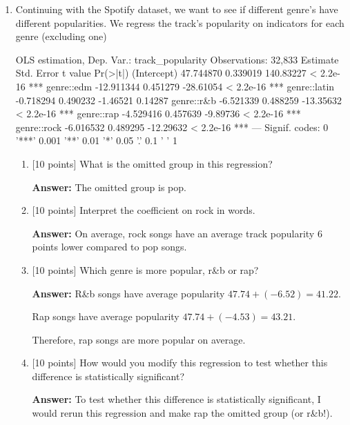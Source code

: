 \documentclass[12pt]{article}
\newcommand{\answer}[1]{{\color{blue_winged_teal}\textbf{Answer:} #1}}
\newcommand{\pts}[1]{{\color{zinc500}[#1 points]}}
\begin{document}
\begin{enumerate}
\begin{enumerate}
    \item \pts{10} Form a 95\% confidence interval for the coefficient. 
    
    \answer{With 95\% confidence, the slope coefficient falls in this range:
    $$
      \left( 11.1497 - 1.96 * 0.945354 , 11.1497 + 1.96 * 0.945354 \right) = (9.30, 13)
    $$}
  \end{enumerate}
  

  \newpage

  \vspace{5mm}
  \item Continuing with the Spotify dataset, we want to see if different genre's have different popularities. We regress the track's popularity on indicators for each genre (excluding one)
  \begin{codeblock}[{}]
OLS estimation, Dep. Var.: track_popularity
Observations: 32,833
               Estimate Std. Error   t value  Pr(>|t|)    
(Intercept)   47.744870   0.339019 140.83227 < 2.2e-16 ***
genre::edm   -12.911344   0.451279 -28.61054 < 2.2e-16 ***
genre::latin  -0.718294   0.490232  -1.46521   0.14287    
genre::r&b    -6.521339   0.488259 -13.35632 < 2.2e-16 ***
genre::rap    -4.529416   0.457639  -9.89736 < 2.2e-16 ***
genre::rock   -6.016532   0.489295 -12.29632 < 2.2e-16 ***
---
Signif. codes:  0 '***' 0.001 '**' 0.01 '*' 0.05 '.' 0.1 ' ' 1
  \end{codeblock}

  \begin{enumerate}
    \item \pts{10} What is the omitted group in this regression?
    
    \answer{The omitted group is pop.}

    \item \pts{10} Interpret the coefficient on rock in words.
    
    \answer{On average, rock songs have an average track popularity 6 points lower compared to pop songs.}
    
    \item \pts{10} Which genre is more popular, r\&b or rap?
    
    \answer{
      R\&b songs have average popularity $47.74 + (-6.52) = 41.22$.

      Rap songs have average popularity $47.74 + (-4.53) = 43.21$.

      Therefore, rap songs are more popular on average.
    }

    \item \pts{10} How would you modify this regression to test whether this difference is statistically significant?
    
    \answer{
      To test whether this difference is statistically significant, I would rerun this regression and make rap the omitted group (or r\&b!).  
    }
  \end{enumerate}
\end{enumerate}
\end{document}
